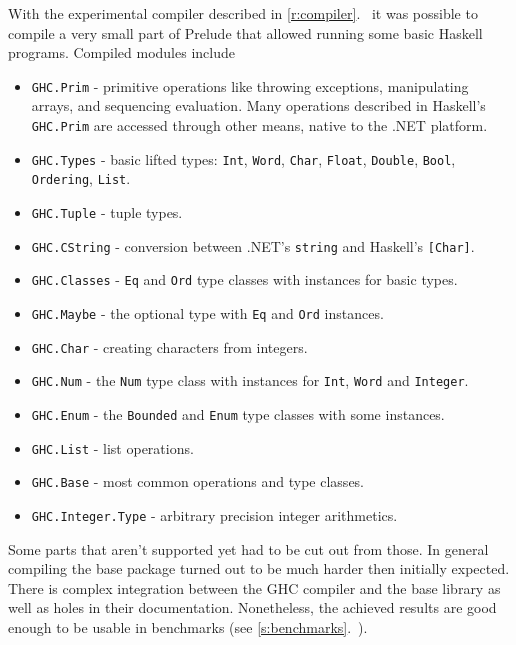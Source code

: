 \documentclass[en]{pracamgr}
\newcommand{\myref}[1]{\ref{#1}.~\textit{\nameref{#1}}}
\begin{document}
With the experimental compiler described in \myref{r:compiler}
it was possible to compile a very small part of Prelude that allowed
running some basic Haskell programs. Compiled modules include

\begin{itemize}
    \item \texttt{GHC.Prim} - primitive operations like throwing exceptions,
            manipulating arrays, and sequencing evaluation. Many
            operations described in Haskell's \texttt{GHC.Prim} are accessed
            through other means, native to the .NET platform.
    \item \texttt{GHC.Types} - basic lifted types: \texttt{Int}, \texttt{Word},
            \texttt{Char}, \texttt{Float}, \texttt{Double}, \texttt{Bool},
            \texttt{Ordering}, \texttt{List}.
    \item \texttt{GHC.Tuple} - tuple types.
    \item \texttt{GHC.CString} - conversion between .NET's \texttt{string} and
            Haskell's \texttt{[Char]}.
    \item \texttt{GHC.Classes} - \texttt{Eq} and \texttt{Ord} type classes with
            instances for basic types.
    \item \texttt{GHC.Maybe} - the optional type with \texttt{Eq} and \texttt{Ord} instances.
    \item \texttt{GHC.Char} - creating characters from integers.
    \item \texttt{GHC.Num} - the \texttt{Num} type class with instances for \texttt{Int},
            \texttt{Word} and \texttt{Integer}.
    \item \texttt{GHC.Enum} - the \texttt{Bounded} and \texttt{Enum} type classes with some instances.
    \item \texttt{GHC.List} - list operations.
    \item \texttt{GHC.Base} - most common operations and type classes.
    \item \texttt{GHC.Integer.Type} - arbitrary precision integer arithmetics.
\end{itemize}

Some parts that aren't supported yet had to be cut out from those.
In general compiling the base package turned out to be much harder
then initially expected. There is complex integration between the GHC compiler and the
base library as well as holes in their documentation.
Nonetheless, the achieved results are good enough to be usable in benchmarks
(see \myref{s:benchmarks}).
\end{document}
